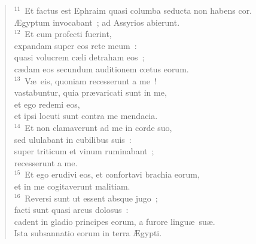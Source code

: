 \begin{flushleft}
\begin{verse}
${}^{11}$~Et factus est Ephraim quasi columba seducta non habens cor.\\ \AE gyptum invocabant~; ad Assyrios abierunt.\\
${}^{12}$~Et cum profecti fuerint,\\ expandam super eos rete meum~:\\ quasi volucrem c\ae li detraham eos~;\\ c\ae dam eos secundum auditionem cœtus eorum.\\
${}^{13}$~V\ae\ eis, quoniam recesserunt a me~!\\ vastabuntur, quia pr\ae varicati sunt in me,\\ et ego redemi eos,\\ et ipsi locuti sunt contra me mendacia.\\
${}^{14}$~Et non clamaverunt ad me in corde suo,\\ sed ululabant in cubilibus suis~:\\ super triticum et vinum ruminabant~;\\ recesserunt a me.\\
${}^{15}$~Et ego erudivi eos, et confortavi brachia eorum,\\ et in me cogitaverunt malitiam.\\
${}^{16}$~Reversi sunt ut essent absque jugo~;\\ facti sunt quasi arcus dolosus~:\\ cadent in gladio principes eorum, a furore lingu\ae\ su\ae .\\ Ista subsannatio eorum in terra \AE gypti.\end{verse}\end{flushleft}


